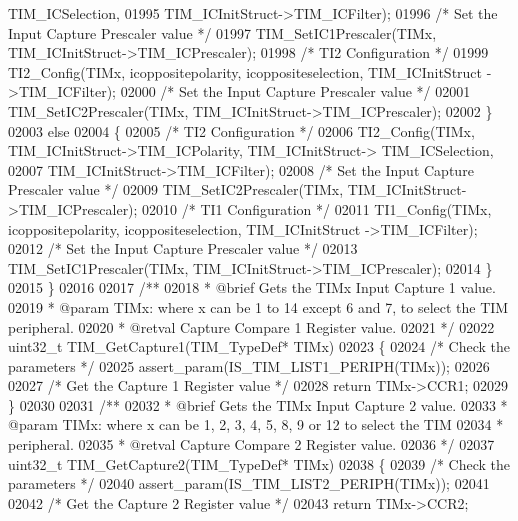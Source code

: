 \begin{DoxyCode}
      TIM_ICSelection,
01995                TIM\_ICInitStruct->TIM_ICFilter);
01996     \textcolor{comment}{/* Set the Input Capture Prescaler value */}
01997     TIM_SetIC1Prescaler(TIMx, TIM\_ICInitStruct->TIM_ICPrescaler);
01998     \textcolor{comment}{/* TI2 Configuration */}
01999     TI2_Config(TIMx, icoppositepolarity, icoppositeselection, TIM\_ICInitStruct
      ->TIM_ICFilter);
02000     \textcolor{comment}{/* Set the Input Capture Prescaler value */}
02001     TIM_SetIC2Prescaler(TIMx, TIM\_ICInitStruct->TIM_ICPrescaler);
02002   \}
02003   \textcolor{keywordflow}{else}
02004   \{
02005     \textcolor{comment}{/* TI2 Configuration */}
02006     TI2_Config(TIMx, TIM\_ICInitStruct->TIM_ICPolarity, TIM\_ICInitStruct->
      TIM_ICSelection,
02007                TIM\_ICInitStruct->TIM_ICFilter);
02008     \textcolor{comment}{/* Set the Input Capture Prescaler value */}
02009     TIM_SetIC2Prescaler(TIMx, TIM\_ICInitStruct->TIM_ICPrescaler);
02010     \textcolor{comment}{/* TI1 Configuration */}
02011     TI1_Config(TIMx, icoppositepolarity, icoppositeselection, TIM\_ICInitStruct
      ->TIM_ICFilter);
02012     \textcolor{comment}{/* Set the Input Capture Prescaler value */}
02013     TIM_SetIC1Prescaler(TIMx, TIM\_ICInitStruct->TIM_ICPrescaler);
02014   \}
02015 \}
02016 
02017 \textcolor{comment}{/**}
02018 \textcolor{comment}{  * @brief  Gets the TIMx Input Capture 1 value.}
02019 \textcolor{comment}{  * @param  TIMx: where x can be 1 to 14 except 6 and 7, to select the TIM peripheral.}
02020 \textcolor{comment}{  * @retval Capture Compare 1 Register value.}
02021 \textcolor{comment}{  */}
02022 uint32\_t TIM_GetCapture1(TIM\_TypeDef* TIMx)
02023 \{
02024   \textcolor{comment}{/* Check the parameters */}
02025   assert_param(IS\_TIM\_LIST1\_PERIPH(TIMx));
02026 
02027   \textcolor{comment}{/* Get the Capture 1 Register value */}
02028   \textcolor{keywordflow}{return} TIMx->CCR1;
02029 \}
02030 
02031 \textcolor{comment}{/**}
02032 \textcolor{comment}{  * @brief  Gets the TIMx Input Capture 2 value.}
02033 \textcolor{comment}{  * @param  TIMx: where x can be 1, 2, 3, 4, 5, 8, 9 or 12 to select the TIM }
02034 \textcolor{comment}{  *         peripheral.}
02035 \textcolor{comment}{  * @retval Capture Compare 2 Register value.}
02036 \textcolor{comment}{  */}
02037 uint32\_t TIM_GetCapture2(TIM\_TypeDef* TIMx)
02038 \{
02039   \textcolor{comment}{/* Check the parameters */}
02040   assert_param(IS\_TIM\_LIST2\_PERIPH(TIMx));
02041 
02042   \textcolor{comment}{/* Get the Capture 2 Register value */}
02043   \textcolor{keywordflow}{return} TIMx->CCR2;

\end{DoxyCode}
